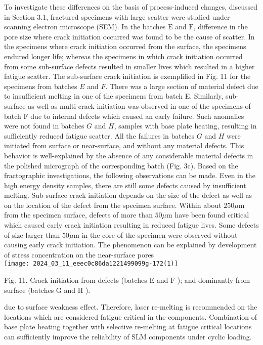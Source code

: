 \documentclass[10pt]{article}
\begin{document}
To investigate these differences on the basis of process-induced changes, discussed in Section 3.1, fractured specimens with large scatter were studied under scanning electron microscope (SEM). In the batches $\mathrm{E}$ and $\mathrm{F}$, difference in the pore size where crack initiation occurred was found to be the cause of scatter. In the specimens where crack initiation occurred from the surface, the specimens endured longer life; whereas the specimens in which crack initiation occurred from some sub-surface defects resulted in smaller lives which resulted in a higher fatigue scatter. The sub-surface crack initiation is exemplified in Fig. 11 for the specimens from batches $E$ and $F$. There was a large section of material defect due to insufficient melting in one of the specimens from batch E. Similarly, sub-surface as well as multi crack initiation was observed in one of the specimens of batch $\mathrm{F}$ due to internal defects which caused an early failure. Such anomalies were not found in batches $G$ and $H$, samples with base plate heating, resulting in sufficiently reduced fatigue scatter. All the failures in batches $G$ and $H$ were initiated from surface or near-surface, and without any material defects. This behavior is well-explained by the absence of any considerable material defects in the polished micrograph of the corresponding batch (Fig. 3c). Based on the fractographic investigations, the following observations can be made. Even in the high energy density samples, there are still some defects caused by insufficient melting. Sub-surface crack initiation depends on the size of the defect as well as on the location of the defect from the specimen surface. Within about $250 \mu \mathrm{m}$ from the specimen surface, defects of more than $50 \mu \mathrm{m}$ have been found critical which caused early crack initiation resulting in reduced fatigue lives. Some defects of size larger than $50 \mu \mathrm{m}$ in the core of the specimen were observed without causing early crack initiation. The phenomenon can be explained by development of stress concentration on the near-surface pores\\
\texttt{[image: 2024\_03\_11\_eeec0c86da1221499099g-172(1)]}

Fig. 11. Crack initiation from defects (batches $\mathrm{E}$ and $\mathrm{F}$ ); and dominantly from surface (batches $\mathrm{G}$ and $\mathrm{H}$ ).

due to surface weakness effect. Therefore, laser re-melting is recommended on the locations which are considered fatigue critical in the components. Combination of base plate heating together with selective re-melting at fatigue critical locations can sufficiently improve the reliability of SLM components under cyclic loading.
\end{document}
